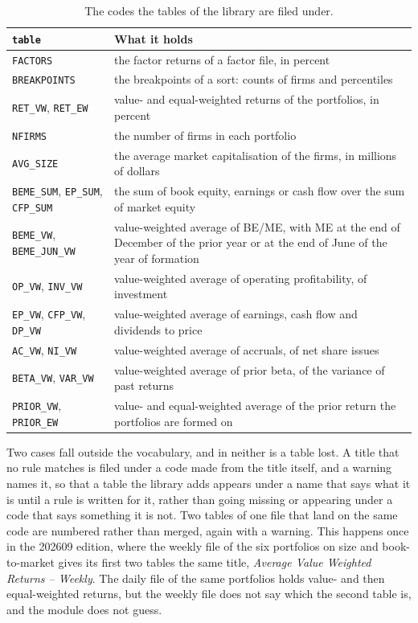 \begin{table}[h!]
	\centering
	\small
	\begin{tabular}{p{4.6cm}p{10cm}}
		\hline
		\verb|table| & What it holds \\
		\hline
		\verb|FACTORS| & the factor returns of a factor file, in percent \\
		\verb|BREAKPOINTS| & the breakpoints of a sort: counts of firms and percentiles \\
		\verb|RET_VW|, \verb|RET_EW| & value- and equal-weighted returns of the portfolios, in percent \\
		\verb|NFIRMS| & the number of firms in each portfolio \\
		\verb|AVG_SIZE| & the average market capitalisation of the firms, in millions of dollars \\
		\verb|BEME_SUM|, \verb|EP_SUM|, \verb|CFP_SUM| & the sum of book equity, earnings or cash flow over the sum of market equity \\
		\verb|BEME_VW|, \verb|BEME_JUN_VW| & value-weighted average of BE/ME, with ME at the end of December of the prior year or at the end of June of the year of formation \\
		\verb|OP_VW|, \verb|INV_VW| & value-weighted average of operating profitability, of investment \\
		\verb|EP_VW|, \verb|CFP_VW|, \verb|DP_VW| & value-weighted average of earnings, cash flow and dividends to price \\
		\verb|AC_VW|, \verb|NI_VW| & value-weighted average of accruals, of net share issues \\
		\verb|BETA_VW|, \verb|VAR_VW| & value-weighted average of prior beta, of the variance of past returns \\
		\verb|PRIOR_VW|, \verb|PRIOR_EW| & value- and equal-weighted average of the prior return the portfolios are formed on \\
		\hline
	\end{tabular}
	\caption{The codes the tables of the library are filed under.\label{tab:famafrenchdata-codes}}
\end{table}

Two cases fall outside the vocabulary, and in neither is a table lost. A title that no rule matches is filed under a code made from the title itself, and a warning names it, so that a table the library adds appears under a name that says what it is until a rule is written for it, rather than going missing or appearing under a code that says something it is not. Two tables of one file that land on the same code are numbered rather than merged, again with a warning. This happens once in the 202609 edition, where the weekly file of the six portfolios on size and book-to-market gives its first two tables the same title, \emph{Average Value Weighted Returns -- Weekly}. The daily file of the same portfolios holds value- and then equal-weighted returns, but the weekly file does not say which the second table is, and the module does not guess.

